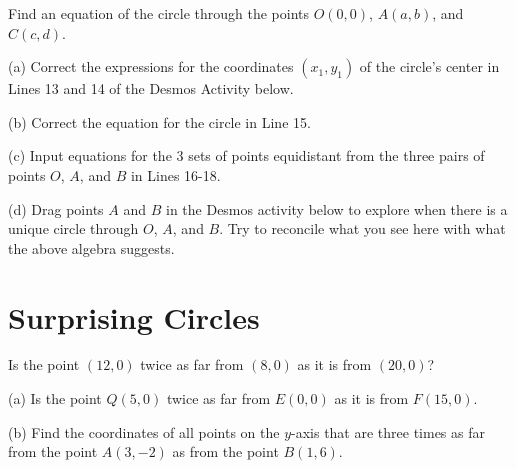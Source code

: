 \documentclass{ximera}
\begin{document}
\begin{example}  \label{Ex8}
Find an equation of the circle through the points $O(0,0)$, $A(a,b)$, and $C(c,d)$.

\begin{exploration}\label{exp:circle8}
(a) Correct the expressions for the coordinates $(x_1,y_1)$ of the circle's center in Lines 13 and 14 of the Desmos Activity below.

(b) Correct the equation for the circle in Line 15.

(c) Input equations for the 3 sets of points equidistant from the three pairs of points $O$, $A$, and $B$ in Lines 16-18.

(d)  Drag points $A$ and $B$ in the Desmos activity below to explore when there is a unique circle through $O$, $A$, and $B$. Try to reconcile what you see here with what the above algebra suggests.

 
 
\begin{onlineOnly}
    \begin{center}
\end{center}
\end{onlineOnly}
\end{exploration}

\end{example}



\section{Surprising Circles}

\begin{exercise}  
  Is the point $(12,0)$ twice as far from $(8,0)$ as it is from $(20,0)$? 
  \begin{multipleChoice}  
        \end{multipleChoice}  
\end{exercise}  



\begin{example}
(a) Is the point $Q(5,0)$ twice as far from $E(0,0)$ as it is from $F(15,0)$.

(b) Find the coordinates of all points on the $y$-axis that are three times as far from the point $A(3,-2)$ as from the point $B(1,6)$. %
\end{example}
\end{document}
